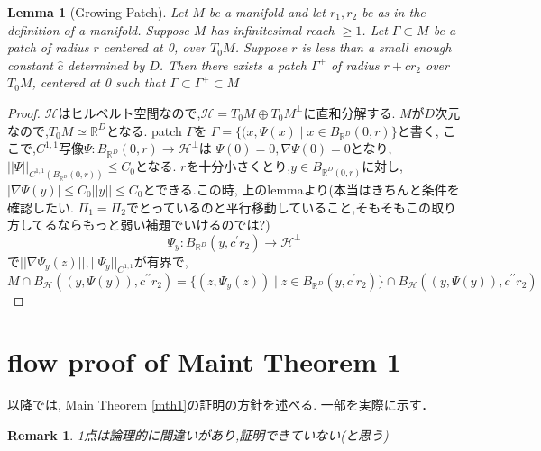 \documentclass{ujarticle}
\newtheorem{lem}[thm]{Lemma}
\newtheorem*{rem}{Remark}
\begin{document}
\begin{lem}[Growing Patch]
  Let $M$ be a manifold and let $r_1,r_2$ be as in the definition of a manifold.
Suppose $M$ has infinitesimal reach $ \ge 1$. Let $\Gamma \subset M$ be a patch of radius $r$ centered at 0, over $T_0M$. Suppose
$r$ is less than a small enough constant $\hat{c}$ determined by $D$. Then there exists a patch $\Gamma^{+}$ of radius $r + cr_2$
over $T_0M$, centered at 0 such that $\Gamma \subset \Gamma^{+} \subset M$
\end{lem}
\begin{proof}
 $\mathcal{H}$はヒルベルト空間なので,$\mathcal{H}=T_0M \oplus T_0M^{\perp}$に直和分解する.
 $M$が$D$次元なので,$T_0M \simeq \mathbb{R}^D$となる.
 patch $\Gamma$を
 $\Gamma =\{(x,\Psi(x) \mid x \in B_{\mathbb{R}^D}(0,r) \}$と書く,
ここで,$C^{1,1}$写像$\Psi: B_{\mathbb{R}^D}(0,r) \to \mathcal{H}^{\perp}$は
$\Psi(0)=0,\nabla\Psi(0)=0$となり,$||\Psi||_{C^{1,1}(B_{\mathbb{R}^D}(0,r))} \le C_0$となる.
$r$を十分小さくとり,$y \in B_{\mathbb{R}^D(0,r)}$に対し,
$|\nabla \Psi(y)| \le C_0||y|| \le C_0$とできる.この時,
上のlemmaより(本当はきちんと条件を確認したい.
$\Pi_1=\Pi_2$でとっているのと平行移動していること,そもそもこの取り方してるならもっと弱い補題でいけるのでは?)
\begin{equation*}
 \Psi_y:B_{\mathbb{R}^D}(y,c^{\prime} r_2) \to \mathcal{H}^{\perp}
\end{equation*}
で$||\nabla\Psi_y(z)||,||\Psi_y||_{C^{1,1}}$が有界で,
\begin{equation*}
 M \cap B_{\mathcal{H}}((y,\Psi(y)),c^{\prime\prime} r_2) =
 \{ (z,\Psi_y(z)) \mid z \in B_{\mathbb{R}^D}(y,c^{\prime} r_2)\}
 \cap B_{\mathcal{H}}((y,\Psi(y)),c^{\prime\prime} r_2)
\end{equation*}
\end{proof}

\section{flow proof of Maint Theorem 1}
\label{sec:証明のフロー}
以降では,
Main Theorem \ref{mth1}の証明の方針を述べる.
一部を実際に示す．
\begin{rem}
1点は論理的に間違いがあり,証明できていない(と思う)
\end{rem}
\end{document}
